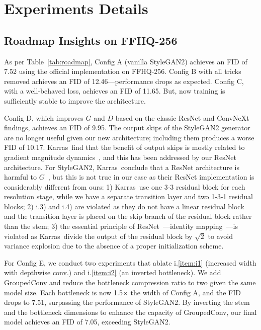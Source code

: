 \vspace{-0.2cm}
\section{Experiments Details}
\label{sec:exp}

\vspace{-0.2cm}
\subsection{Roadmap Insights on FFHQ-256\texorpdfstring{~\cite{sg1}}{}}
\label{sub:arc-experiments}
\vspace{-0.1cm}
As per Table~\ref{tab:roadmap}, Config A (vanilla StyleGAN2) achieves an FID of 7.52 using the official implementation on FFHQ-256. Config B with all tricks removed achieves an FID of 12.46---performance drops as expected. 
Config C, with a well-behaved loss, achieves an FID of 11.65. But, now training is sufficiently stable to improve the architecture.

Config D, which improves $G$ and $D$ based on the classic ResNet and ConvNeXt findings, achieves an FID of 9.95. The output skips of the StyleGAN2 generator are no longer useful given our new architecture; including them produces a worse FID of 10.17. Karras~\etal find that the benefit of output skips is mostly related to gradient magnitude dynamics~\cite{sg3}, and this has been addressed by our ResNet architecture. For StyleGAN2, Karras~\etal conclude that a ResNet architecture is harmful to $G$~\cite{sg2}, but this is not true in our case as their ResNet implementation is considerably different from ours: 1) Karras~\etal use one 3-3 residual block for each resolution stage, while we have a separate transition layer and two 1-3-1 residual blocks; 2) i.3) and i.4) are violated as they do not have a linear residual block~\cite{mobnet} and the transition layer is placed on the skip branch of the residual block rather than the stem; 3) the essential principle of ResNet~\cite{resnet}---identity mapping~\cite{resnet2}---is violated as Karras~\etal divide the output of the residual block by $\sqrt{2}$ to avoid variance explosion due to the absence of a proper initialization scheme.

For Config E, we conduct two experiments that ablate i.\ref{item:i1} (increased width with depthwise conv.) and i.\ref{item:i2} (an inverted bottleneck). We add GroupedConv and reduce the bottleneck compression ratio to two given the same model size. Each bottleneck is now 1.5$\times$ the width of Config A, and the FID drops to 7.51, surpassing the performance of StyleGAN2. By inverting the stem and the bottleneck dimensions to enhance the capacity of GroupedConv, our final model achieves an FID of 7.05, exceeding StyleGAN2.


